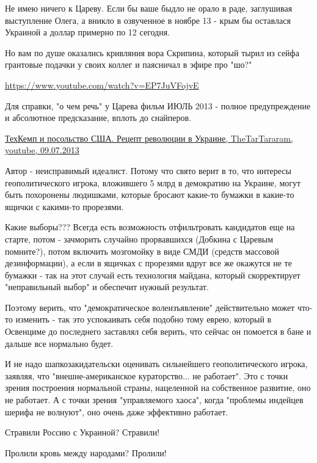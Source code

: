 \begin{itemize}
\begin{itemize}
Не имею ничего к Цареву. Если бы ваше быдло не орало в раде, заглушивая
выступление Олега, а вникло в озвученное в ноябре 13 - крым бы оставлася
Украиной а доллар примерно по 12 сегодня.

Но вам по душе оказались кривляния вора Скрипина, который тырил из сейфа
грантовые подачки у своих коллег и паясничал в эфире про "шо?"

\url{https://www.youtube.com/watch?v=EP7JuVFojvE}

Для справки, "о чем речь" у Царева фильм ИЮЛЬ 2013 - полное предупреждение и
абсолютное предсказание, вплоть до снайперов.

\href{https://www.youtube.com/watch?v=uTKZYTLDnv8}{%
ТехКемп и посольство США. Рецепт революции в Украине, TheTarTararam, youtube, 09.07.2013%
}

\end{itemize} %


Автор - неисправимый идеалист. Потому что свято верит в то, что интересы
геополитического игрока, вложившего 5 млрд в демократию на Украине, могут быть
похоронены людишками, которые бросают какие-то бумажки в какие-то ящички с
какими-то прорезями.

Какие выборы??? Всегда есть возможность отфильтровать кандидатов еще на старте,
потом - зачморить случайно прорвавшихся (Добкина с Царевым помните?), потом
включить мозгомойку в виде СМДИ (средств массовой дезинформации), а если в
ящичках с прорезями вдруг все же окажутся не те бумажки - так на этот случай
есть технология майдана, который скорректирует "неправильный выбор" и обеспечит
нужный результат.

Поэтому верить, что "демократическое волеизъявление" действительно может что-то
изменить - так это успокаивать себя подобно тому еврею, который в Освенциме до
последнего заставлял себя верить, что сейчас он помоется в бане и дальше все
нормально будет.

И не надо шапкозакидательски оценивать сильнейшего геополитического игрока,
заявляя, что "внешне-американское кураторство... не работает". Это с точки
зрения построения нормальной страны, нацеленной на собственное развитие, оно не
работает. А с точки зрения "управляемого хаоса", когда "проблемы индейцев
шерифа не волнуют", оно очень даже эффективно работает.

Стравили Россию с Украиной? Стравили!

Пролили кровь между народами? Пролили!


\end{itemize}
